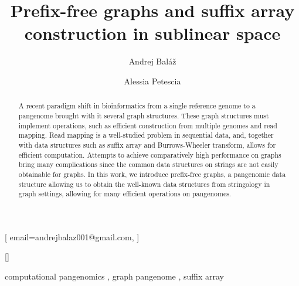 \documentclass[twocolumn]{ceurart}
\begin{document}


\title{Prefix-free graphs and suffix array construction in sublinear space}

\author[1]{Andrej Baláž}[
    email=andrejbalaz001@gmail.com,
]
\cormark[1]

\author[1]{Alessia Petescia}[]

\address[1]{
    Department of Applied Informatics,
    Faculty of Mathematics, Physics and Informatics,
    Comenius University, Bratislava, Slovakia
}


\begin{abstract}
    A recent paradigm shift in bioinformatics from a single reference genome to a pangenome brought with it several graph structures.
    These graph structures must implement operations, such as efficient construction from multiple genomes and read mapping.
    Read mapping is a well-studied problem in sequential data, and, together with data structures such as suffix array and Burrows-Wheeler transform, allows for efficient computation.
    Attempts to achieve comparatively high performance on graphs bring many complications since the common data structures on strings are not easily obtainable for graphs.
    In this work, we introduce prefix-free graphs, a pangenomic data structure allowing us to obtain the well-known data structures from stringology in graph settings, allowing for many efficient operations on pangenomes.
\end{abstract}

\begin{keywords}
    computational pangenomics \sep
    graph pangenome \sep
    suffix array
\end{keywords}

\maketitle
\end{document}
